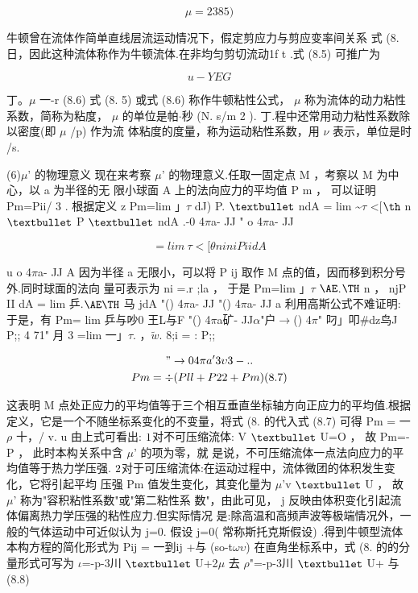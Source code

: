 \[\mu =2385)\]

牛顿曾在流体作简单直线层流运动情况下，假定剪应力与剪应变率间关系 式 (8. 日，因此这种流体称作为牛顿流体.在非均匀剪切流动1f t .式 (8.5) 可推广为

\[u-Y EG\]

丁。$\mu$ 一-r (8.6) 式 (8. 5) 或式 (8.6) 称作牛顿粘性公式， $\mu$ 称为流体的动力粘性系数，简称为粘度， $\mu$ 的单位是帕$\cdot $秒 (N. s/m 2 ). 丁.程中还常用动力粘性系数除以密度(即 $\mu$ /p) 作为流 体粘度的度量，称为运动粘性系数，用 $\nu$ 表示，单位是时 /s.

(6)$\mu$' 的物理意义 现在来考察 $\mu$' 的物理意义.任取一固定点 M ，考察以 M 为中心，以 a 为半径的无 限小球面 A 上的法向应力的平均值 P m ， 可以证明 Pm=Pii/ 3 . 根据定义 z Pm=lim 」$\tau$ dJ) P. ${\rm •}$ ndA = lim \textasciitilde{}$\tau$ <[${\rm þ}$ n ${\rm •}$ P ${\rm •}$ ndA .-0 4$\pi$a- JJ " o 4$\pi$a- JJ

\[=lim~\tau  <[\theta  n in iP ii dA\]

u  o 4$\pi$a- JJ A 因为半径 a 无限小，可以将 P ij 取作 M 点的值，因而移到积分号外.同时球面的法向 量可表示为 ni =.r ;la ， 于是 Pm=lim 」$\tau$ ${\rm Æ}$.${\rm Þ}$ n ， njP II dA = lim 乒.${\rm ÆÞ}$ 马 jdA "() 4$\pi$a- JJ "() 4$\pi$a- JJ a 利用高斯公式不难证明: 于是，有 Pm= lim 乒与吵0 王L与F "() 4$\pi$a矿- JJ$\alpha$"户$\rightarrow$() 4$\pi$" 叼」叩\#dz鸟J P;; 4 71" 月 3 =lim 一」$\tau$. ，$\tilde{w}$. 8;i = : P;;

\begin{gather*}
"\rightarrow  04\pi a' 3 \upsilon 3 - ..\\
Pm=\div (Pll+P22+Pm) (8. 7)
\end{gather*}

这表明 M 点处正应力的平均值等于三个相互垂直坐标轴方向正应力的平均值.根据 定义，它是一个不随坐标系变化的不变量，将式 (8. 的代入式 (8.7) 可得 Pm = 一 $\rho$ 十，/ v. u 由上式可看出: ${\rm 1}$对不可压缩流体: V ${\rm •}$ U=O ， 故 Pm=-P ， 此时本构关系中含 $\mu$' 的项为零，就 是说，不可压缩流体一点法向应力的平均值等于热力学压强. ${\rm 2}$对于可压缩流体:在运动过程中，流体微团的体积发生变化，它将引起平均 压强 Pm 值发生变化，其变化量为 $\mu$'v ${\rm •}$ U ， 故 $\mu$' 称为"容积粘性系数"或"第二粘性系 数"，由此可见， j 反映由体积变化引起流体偏离热力学压强的粘性应力.但实际情况 是:除高温和高频声波等极端情况外，一般的气体运动中可近似认为 j=0. 假设 j=0( 常称斯托克斯假设) .得到牛顿型流体本构方程的简化形式为 Pij = 一到ij +与 (so-t$\omega$$\upsilon$) 在直角坐标系中，式 (8. 的的分量形式可写为 $\iota$=-p-3川 ${\rm •}$ U+2$\mu$ 去 $\rho$"=-p-3川 ${\rm •}$ U+ 与 (8.8)


